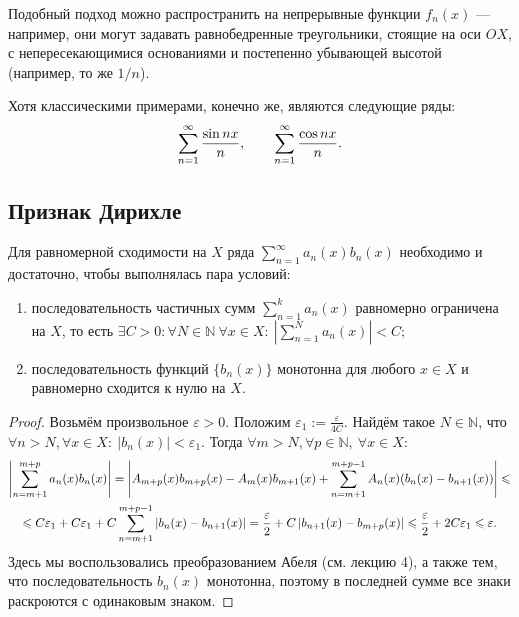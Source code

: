 \documentclass[a4paper, 12pt]{article}
\begin{document}
	Подобный подход можно распространить на непрерывные функции $f_n(x)$ --- например, они могут задавать равнобедренные треугольники, стоящие на оси $OX$, с непересекающимися основаниями и постепенно убывающей высотой (например, то же $1/n$).
	
	Хотя классическими примерами, конечно же, являются следующие ряды:
	$$
	\sum\limits_{n=1}^{\infty} \frac{\sin nx}{n}, \qquad \sum\limits_{n=1}^{\infty} \frac{\cos nx}{n}.
	$$

	\subsection{Признак Дирихле}	
	
	\begin{Test}
		Для равномерной сходимости на $X$ ряда $\sum\limits_{n = 1}^\infty a_n(x) b_n(x)$ необходимо и достаточно, чтобы выполнялась пара условий:
		\begin{enumerate}
			\item  последовательность частичных сумм $\sum\limits_{n = 1}^k a_n(x) $ равномерно ограничена на $X$, то есть $\exists C>0 : \forall N\in \mathbb{N} \ \forall x \in X: \  \left| \sum\limits_{n = 1}^N a_n(x)\right|  <C$;
			
			\item  последовательность функций $\{b_n(x)\}$ монотонна для любого $x \in X$ и равномерно сходится к нулю на $X$.
		\end{enumerate}
	\end{Test}
	
	\begin{proof}
		Возьмём произвольное $\varepsilon>0$. Положим $\varepsilon_1 := \frac{\varepsilon}{4C}$. Найдём такое $N\in \mathbb{N}$, что $\forall n > N, \forall x \in X: \  \left| b_n(x) \right| < \varepsilon_1.$
		Тогда $\forall m>N, \forall p \in \mathbb{N}, \ \forall x \in X:$
		\begin{multline}
		\left| \sum\limits_{n = m+1}^{m+p} a_n(x) b_n(x)\right| = \left| A_{m+p}(x)b_{m+p}(x) - A_{m}(x)b_{m+1}(x)+ \sum\limits_{n = m+1}^{m+p-1} A_n(x)( b_n(x)-b_{n+1}(x)) \right| \leqslant\\
		\leqslant C\varepsilon_1+C\varepsilon_1+C\sum\limits_{n = m+1}^{m+p-1} | b_n(x)-b_{n+1}(x)|=\frac{\varepsilon}{2} + C\left|b_{n+1}(x) - b_{m+p}(x) \right| \leqslant \frac{\varepsilon}{2} + 2C\varepsilon_1 \leqslant \varepsilon.
		\end{multline}
		Здесь мы воспользовались преобразованием Абеля (см. лекцию 4), а также тем, что последовательность $b_n(x)$ монотонна, поэтому в последней сумме все знаки раскроются с одинаковым знаком.
	\end{proof}
	
\end{document}
